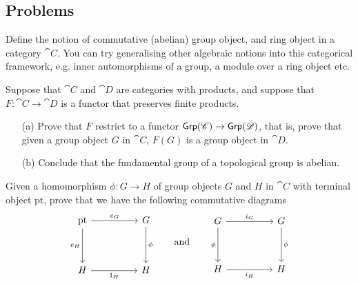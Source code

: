 \vspace*{0.2in}

\subsection{Problems}\vspace{0.1in}

\begin{problem}\label{prob B`.1}
Define the notion of commutative (abelian) group object, and ring object in a category $\cat{C}$. You can try generalising other algebraic notions into this categorical framework, e.g. inner automorphisms of a group, a module over a ring object etc.
\end{problem}

\vspace*{0.1in}

\begin{problem}\label{prob B.2}
Suppose that $\cat{C}$ and $\cat{D}$ are categories with products, and suppose that $F: \cat{C} \to \cat{D}$ is a functor that preserves finite products. 
\begin{itemize}
\item[(a)] Prove that $F$ restrict to a functor $\mathsf{Grp}(\mathscr{C}) \to \mathsf{Grp}(\mathscr{D})$, that is, prove that given a group object $G$ in $\cat{C}$, $F(G)$ is a group object in $\cat{D}$.
\item[(b)] Conclude that the fundamental group of a topological group is abelian.
\end{itemize}
\end{problem}

\vspace*{0.1in}

\begin{problem}\label{prob B.3}
Given a homomorphism $\phi:G \to H$ of group objects $G$ and $H$ in $\cat{C}$ with terminal object $\mathrm{pt}$, prove that we have the following commutative diagrams
\[\begin{tikzcd}[row sep=huge, column sep = huge]
\mathrm{pt} \arrow[d, "e_H"'] \arrow[r, "e_G"] & G \arrow[d, "\phi"] \\
H \arrow[r, "1_H"']                                                 & H                       
\end{tikzcd}
\qquad \text{and} \qquad
\begin{tikzcd}[row sep=huge, column sep = huge]
G \arrow[d, "\phi"'] \arrow[r, "i_G"] & G \arrow[d, "\phi"] \\
H \arrow[r, "i_H"']                                                 & H                       
\end{tikzcd}\]
\end{problem}

